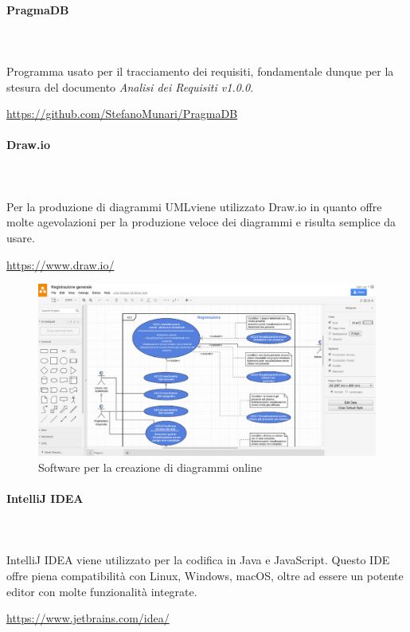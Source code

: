 		\paragraph{PragmaDB} \mbox{}\\ \mbox{}\\
		Programma usato per il tracciamento dei requisiti, fondamentale dunque per la stesura del documento \textit{Analisi dei Requisiti v1.0.0}. \newline
		\centerline{\url{https://github.com/StefanoMunari/PragmaDB}}
		\paragraph{Draw.io} \mbox{}\\ \mbox{}\\
		Per la produzione di diagrammi UML\glosp viene utilizzato Draw.io in quanto offre molte agevolazioni per la produzione veloce dei diagrammi e risulta semplice da usare. \newline
		\centerline{\url{https://www.draw.io/}}
		\begin{figure}[H]
			\includegraphics[width=0.99\linewidth]{res/images/drawio.jpg}
			\caption{Software per la creazione di diagrammi online}
		\end{figure} 
		\paragraph{IntelliJ IDEA} \mbox{}\\ \mbox{}\\
		IntelliJ IDEA viene utilizzato per la codifica in Java e JavaScript. Questo IDE offre piena compatibilità con Linux, Windows, macOS, oltre ad essere un potente editor con molte funzionalità integrate. \newline
		\centerline{\url{https://www.jetbrains.com/idea/}}

